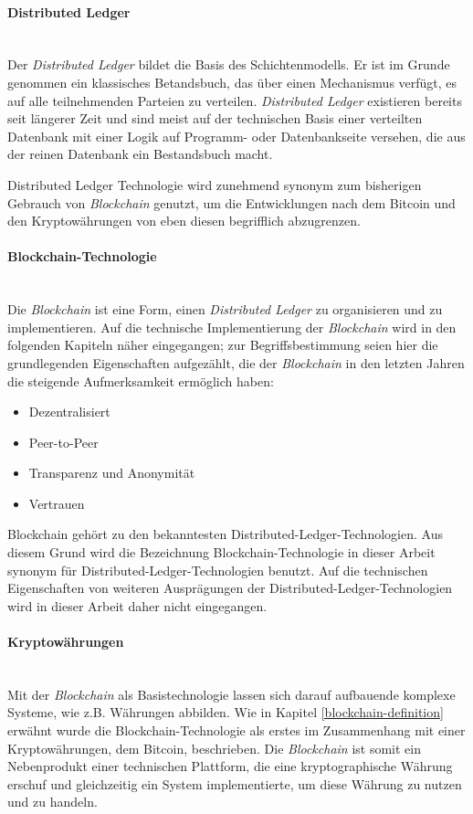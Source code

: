 \paragraph{Distributed Ledger}$~~$\\
Der \textit{Distributed Ledger} bildet die Basis des Schichtenmodells. Er ist im Grunde genommen ein klassisches Betandsbuch, das über einen Mechanismus verfügt, es auf alle teilnehmenden Parteien zu verteilen. \textit{Distributed Ledger} existieren bereits seit längerer Zeit und sind meist auf der technischen Basis einer verteilten Datenbank mit einer Logik auf Programm- oder Datenbankseite versehen, die aus der reinen Datenbank ein Bestandsbuch macht.

Distributed Ledger Technologie wird zunehmend synonym zum bisherigen Gebrauch von \textit{Blockchain} genutzt, um die Entwicklungen nach dem Bitcoin und den Kryptowährungen von eben diesen begrifflich abzugrenzen.

\paragraph{Blockchain-Technologie}$~~$\\
Die \textit{Blockchain} ist eine Form, einen \textit{Distributed Ledger} zu organisieren und zu implementieren. Auf die technische Implementierung der \textit{Blockchain} wird in den folgenden Kapiteln näher eingegangen; zur Begriffsbestimmung seien hier die grundlegenden Eigenschaften aufgezählt, die der \textit{Blockchain} in den letzten Jahren die steigende Aufmerksamkeit ermöglich haben:

\begin{itemize}
  \item Dezentralisiert
  \item Peer-to-Peer
  \item Transparenz und Anonymität
  \item Vertrauen
\end{itemize}

Blockchain gehört zu den bekanntesten Distributed-Ledger-Technologien. Aus diesem Grund wird die Bezeichnung Blockchain-Technologie in dieser Arbeit synonym für Distributed-Ledger-Technologien benutzt. Auf die technischen Eigenschaften von weiteren Ausprägungen der Distributed-Ledger-Technologien wird in dieser Arbeit daher nicht eingegangen.

\paragraph{Kryptowährungen}$~~$\\
Mit der \textit{Blockchain} als Basistechnologie lassen sich darauf aufbauende komplexe Systeme, wie z.B. Währungen abbilden. Wie in Kapitel \ref{blockchain-definition} erwähnt wurde die Blockchain-Technologie als erstes im Zusammenhang mit einer Kryptowährungen, dem Bitcoin, beschrieben. Die \textit{Blockchain} ist somit ein Nebenprodukt einer technischen Plattform, die eine kryptographische Währung erschuf und gleichzeitig ein System implementierte, um diese Währung zu nutzen und zu handeln.

